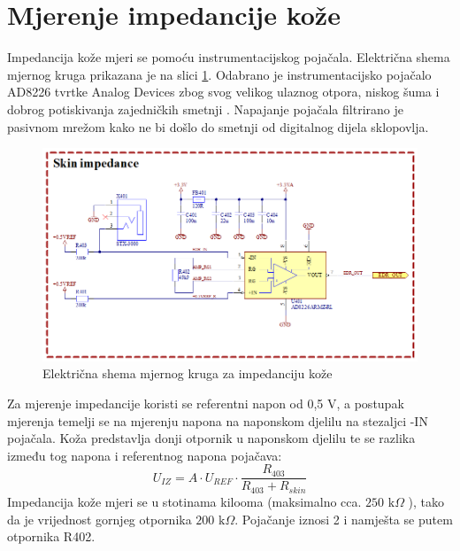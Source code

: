 \section{Mjerenje impedancije kože}
Impedancija kože mjeri se pomoću instrumentacijskog pojačala. Električna shema mjernog kruga prikazana je na slici \ref{slk:EDR}. Odabrano je instrumentacijsko pojačalo AD8226 tvrtke Analog Devices zbog svog velikog ulaznog otpora, niskog šuma i dobrog potiskivanja zajedničkih smetnji \cite{ad:ad8226}. Napajanje pojačala filtrirano je pasivnom mrežom kako ne bi došlo do smetnji od digitalnog dijela sklopovlja.
\begin{figure}[htb]
    \centering
    \includegraphics[width=\textwidth]{Figures/EDR.png}
    \caption{Električna shema mjernog kruga za impedanciju kože}
    \label{slk:EDR}
\end{figure}
Za mjerenje impedancije koristi se referentni napon od 0,5 V, a postupak mjerenja temelji se na mjerenju napona na naponskom djelilu na stezaljci -IN pojačala. Koža predstavlja donji otpornik u naponskom djelilu te se razlika između tog napona i referentnog napona pojačava:
\begin{equation} \label{eq:EDR}
    U_{IZ}=A\cdot U_{REF}\cdot \frac{R_{403}}{R_{403}+R_{skin}}
\end{equation}
Impedancija kože mjeri se u stotinama kilooma (maksimalno cca. $250\textrm{ k}\Omega$ \cite{rskin}), tako da je vrijednost gornjeg otpornika $200\textrm{ k}\Omega$. Pojačanje iznosi 2 i namješta se putem otpornika R402.

